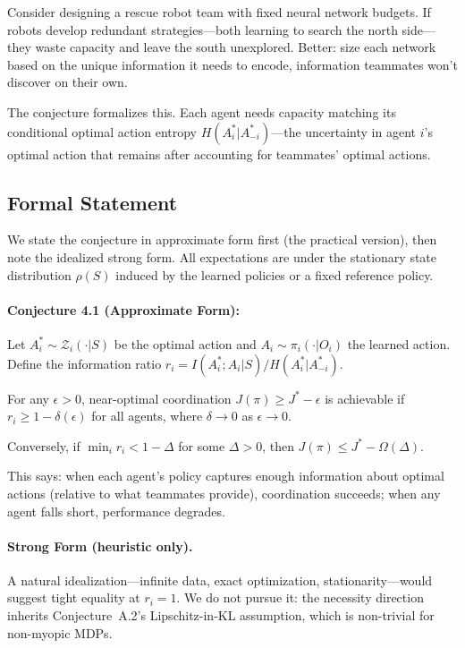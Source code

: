 \documentclass[10pt, letterpaper]{article}
\begin{document}
Consider designing a rescue robot team with fixed neural network budgets. If robots develop redundant strategies---both learning to search the north side---they waste capacity and leave the south unexplored. Better: size each network based on the unique information it needs to encode, information teammates won't discover on their own.

The conjecture formalizes this. Each agent needs capacity matching its conditional optimal action entropy $H(A_i^*|A_{-i}^*)$---the uncertainty in agent $i$'s optimal action that remains after accounting for teammates' optimal actions.

\subsection{Formal Statement}

We state the conjecture in approximate form first (the practical version), then note the idealized strong form. All expectations are under the stationary state distribution $\rho(S)$ induced by the learned policies or a fixed reference policy.

\paragraph{Conjecture 4.1 (Approximate Form):} Let $A_i^* \sim \mathcal{Z}_i(\cdot|S)$ be the optimal action and $A_i \sim \pi_i(\cdot|O_i)$ the learned action. Define the information ratio $r_i = I(A_i^*; A_i | S) / H(A_i^* | A_{-i}^*)$.

For any $\epsilon > 0$, near-optimal coordination $J(\pi) \geq J^* - \epsilon$ is achievable if $r_i \geq 1 - \delta(\epsilon)$ for all agents, where $\delta \to 0$ as $\epsilon \to 0$.

Conversely, if $\min_i r_i < 1 - \Delta$ for some $\Delta > 0$, then $J(\pi) \leq J^* - \Omega(\Delta)$.

\bigskip

This says: when each agent's policy captures enough information about optimal actions (relative to what teammates provide), coordination succeeds; when any agent falls short, performance degrades.

\paragraph{Strong Form (heuristic only).} A natural idealization---infinite data, exact optimization, stationarity---would suggest tight equality at $r_i = 1$. We do not pursue it: the necessity direction inherits Conjecture~A.2's Lipschitz-in-KL assumption, which is non-trivial for non-myopic MDPs.
\end{document}
